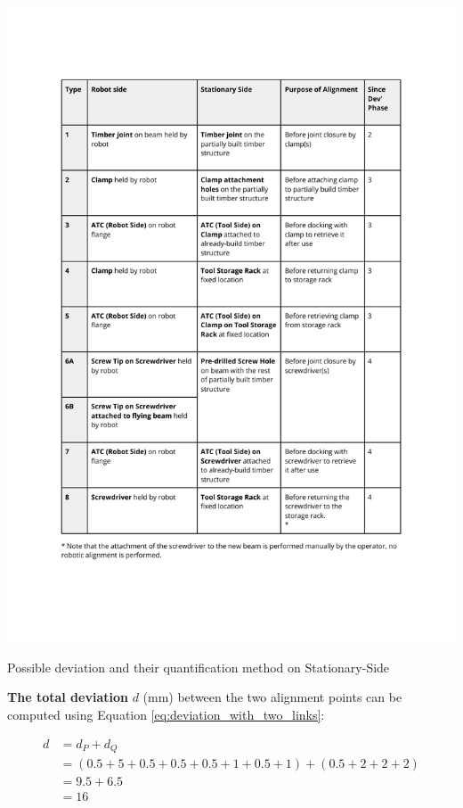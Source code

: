 \begin{table}
    \includegraphics[page=4, trim=25.4mm 165mm 25.4mm 33mm, clip, width=\textwidth]{tables/Tables in Chapter 9 to 11.pdf}
    \caption{Possible deviation and their quantification method on Stationary-Side}
    \label{table:deviation_stationary_side}
\end{table}

\textbf{The total deviation} $d$ (mm) between the two alignment points can be computed using Equation \ref{eq:deviation_with_two_links}:

\begin{align}
    d &= d_P + d_Q \nonumber\\
      &= (0.5 + 5 + 0.5 + 0.5 + 0.5 + 1 + 0.5 + 1) + (0.5 + 2 + 2 + 2)\nonumber\\
      &= 9.5 + 6.5\nonumber\\
      &= 16\nonumber
\end{align}

